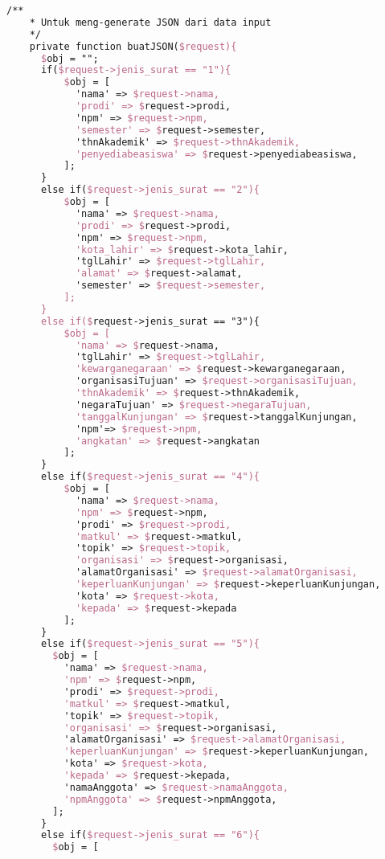 \begin{lstlisting}[language=tex,basicstyle=\tiny,caption=PesanansuratController.php]
    /**
    * Untuk meng-generate JSON dari data input
    */
    private function buatJSON($request){
      $obj = "";
      if($request->jenis_surat == "1"){
          $obj = [
            'nama' => $request->nama,
            'prodi' => $request->prodi,
            'npm' => $request->npm,
            'semester' => $request->semester,
            'thnAkademik' => $request->thnAkademik,
            'penyediabeasiswa' => $request->penyediabeasiswa,
          ];
      }
      else if($request->jenis_surat == "2"){
          $obj = [
            'nama' => $request->nama,
            'prodi' => $request->prodi,
            'npm' => $request->npm,
            'kota_lahir' => $request->kota_lahir,
            'tglLahir' => $request->tglLahir,
            'alamat' => $request->alamat,
            'semester' => $request->semester,
          ];
      }
      else if($request->jenis_surat == "3"){
          $obj = [
            'nama' => $request->nama,
            'tglLahir' => $request->tglLahir,
            'kewarganegaraan' => $request->kewarganegaraan,
            'organisasiTujuan' => $request->organisasiTujuan,
            'thnAkademik' => $request->thnAkademik,
            'negaraTujuan' => $request->negaraTujuan,
            'tanggalKunjungan' => $request->tanggalKunjungan,
            'npm'=> $request->npm,
            'angkatan' => $request->angkatan
          ];
      }
      else if($request->jenis_surat == "4"){
          $obj = [
            'nama' => $request->nama,
            'npm' => $request->npm,
            'prodi' => $request->prodi,
            'matkul' => $request->matkul,
            'topik' => $request->topik,
            'organisasi' => $request->organisasi,
            'alamatOrganisasi' => $request->alamatOrganisasi,
            'keperluanKunjungan' => $request->keperluanKunjungan,
            'kota' => $request->kota,
            'kepada' => $request->kepada
          ];
      }
      else if($request->jenis_surat == "5"){
        $obj = [
          'nama' => $request->nama,
          'npm' => $request->npm,
          'prodi' => $request->prodi,
          'matkul' => $request->matkul,
          'topik' => $request->topik,
          'organisasi' => $request->organisasi,
          'alamatOrganisasi' => $request->alamatOrganisasi,
          'keperluanKunjungan' => $request->keperluanKunjungan,
          'kota' => $request->kota,
          'kepada' => $request->kepada,
          'namaAnggota' => $request->namaAnggota,
          'npmAnggota' => $request->npmAnggota,
        ];
      }
      else if($request->jenis_surat == "6"){
        $obj = [

\end{lstlisting}
